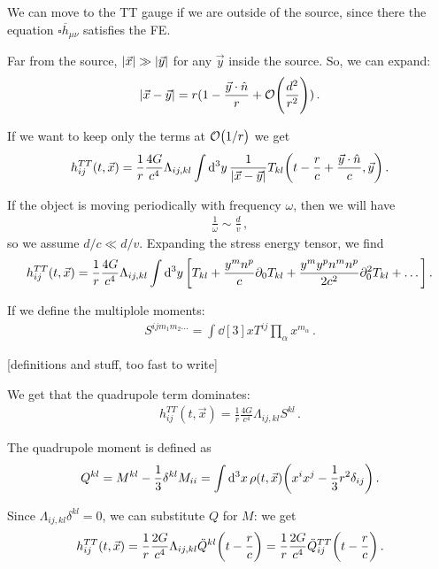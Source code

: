 \documentclass[main.tex]{subfiles}
\begin{document}
We can move to the TT gauge if we are outside of the source, since there the equation \(\square \overline{h}_{\mu \nu }\) satisfies the FE. 

Far from the source, \(\abs{\vec{x}} \gg \abs{\vec{y}}\) for any \(\vec{y}\) inside the source. So, we can expand: 
%
\begin{align}
\abs{\vec{x} - \vec{y}} = r (1 - \frac{\vec{y} \cdot \hat{n}}{r} + \order{\frac{d^2}{r^2}})
\,.
\end{align}

If we want to keep only the terms at \(\order{1/r}\) we get 
%
\begin{align}
h_{ij}^{TT} (t, \vec{x}) = \frac{1}{r} \frac{4G}{c^{4}}
\Lambda_{ij, kl} \int \dd[3]{y} \frac{1}{\abs{\vec{x} - \vec{y}}}
T_{kl} \qty(t - \frac{r}{c} + \frac{\vec{y} \cdot \hat{n}}{c}, \vec{y})
\,.
\end{align}

If the object is moving periodically with frequency \(\omega \), then we will have 
%
\begin{align}
\frac{1}{\omega } \sim \frac{d}{v}
\,,
\end{align}
%
so we assume \(d/c \ll d/v\). Expanding the stress energy tensor, we find 
%
\begin{align}
h_{ij}^{TT} (t, \vec{x}) = \frac{1}{r} \frac{4G}{c^{4}} \Lambda_{ij, kl} \int \dd[3]{y}\qty[T_{kl} + \frac{y^{m} n^{p}}{c} \partial_0 T_{kl}  + \frac{y^{m} y^{p} n^{m} n^{p}}{2c^2} \partial_0^2 T_{kl} + \dots]
\,.
\end{align}

If we define the multiplole moments: 
%
\begin{align}
S^{ij m_1 m_2 \dots} = \int \dd[3]{x} T^{ij} \prod_\alpha  x^{m_\alpha }
\,.
\end{align}

[definitions and stuff, too fast to write]

We get that the quadrupole term dominates: 
%
\begin{align}
h_{ij}^{TT} (t, \vec{x}) = \frac{1}{r} \frac{4G}{c^{4}}
\Lambda_{ij, kl} S^{kl}
\,.
\end{align}

The quadrupole moment is defined as 
%
\begin{align}
Q^{kl} = M^{kl} - \frac{1}{3} \delta^{kl} M_{ii} 
= \int \dd[3]{x} \rho (t, \vec{x}) \qty(x^{i} x^{j} - \frac{1}{3} r^2 \delta_{ij})
\,.
\end{align}

Since \(\Lambda_{ij, kl} \delta^{kl} =0 \), we can substitute \(Q\) for \(M\): we get 
%
\begin{align}
h_{ij}^{TT} (t, \vec{x}) = \frac{1}{r} \frac{2G}{c^{4}}
\Lambda_{ij, kl} \ddot{Q}^{kl} \qty(t - \frac{r}{c})
= \frac{1}{r} \frac{2G}{c^{4}} \ddot{Q}^{TT}_{ij} \qty(t - \frac{r}{c})
\,.
\end{align}
\end{document}
